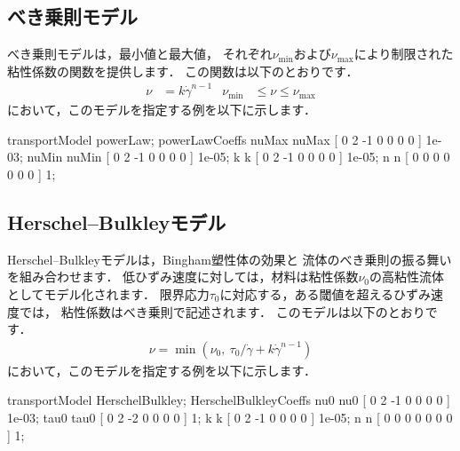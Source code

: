 \subsection{べき乗則モデル}
\label{ssec:7.3.4@3.0.1}
べき乗則モデルは，最小値と最大値，
それぞれ$\nu_{\mathrm{min}}$および$\nu_{\mathrm{max}}$により制限された
粘性係数の関数を提供します．
この関数は以下のとおりです．
\begin{align}
 \label{eq:7.16@3.0.1}
 \nu &= k\dot{\gamma}^{n-1} &
 \nu_{\mathrm{min}} &\le \nu \le \nu_{\mathrm{max}}
\end{align}
において，このモデルを指定する例を以下に示します．
\begin{OFverbatim}[file]
transportModel powerLaw;
powerLawCoeffs
{
    nuMax           nuMax [ 0 2 -1 0 0 0 0 ] 1e-03;
    nuMin           nuMin [ 0 2 -1 0 0 0 0 ] 1e-05;
    k               k     [ 0 2 -1 0 0 0 0 ] 1e-05;
    n               n     [ 0 0  0 0 0 0 0 ] 1;
}
\end{OFverbatim}


\subsection{Herschel--Bulkleyモデル}
\label{ssec:7.3.5@3.0.1}
Herschel--Bulkleyモデルは，Bingham塑性体の効果と
流体のべき乗則の振る舞いを組み合わせます．
低ひずみ速度に対しては，材料は粘性係数$\nu_{0}$の高粘性流体としてモデル化されます．
限界応力$\tau_{0}$に対応する，ある閾値を超えるひずみ速度では，
粘性係数はべき乗則で記述されます．
このモデルは以下のとおりです．
\begin{align}
 \label{eq:7.17@3.0.1}
 \nu = \min\left(\nu_{0},\ \tau_{0}/\dot{\gamma} + k\dot{\gamma}^{n-1}\right)
\end{align}
において，このモデルを指定する例を以下に示します．
\begin{OFverbatim}[file]
transportModel HerschelBulkley;
HerschelBulkleyCoeffs
{
    nu0             nu0  [ 0 2 -1 0 0 0 0 ] 1e-03;
    tau0            tau0 [ 0 2 -2 0 0 0 0 ] 1;
    k               k    [ 0 2 -1 0 0 0 0 ] 1e-05;
    n               n    [ 0 0  0 0 0 0 0 ] 1;
}
\end{OFverbatim}

